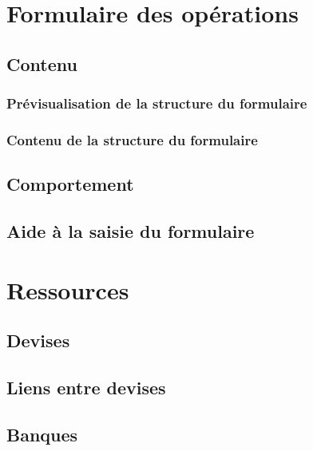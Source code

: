 \section{Formulaire des opérations\label{setup-form}}
 

\subsection{Contenu\label{setup-form-content}}


\subsubsection{Prévisualisation de la structure du formulaire\label{setup-form-content-display}}

\subsubsection{Contenu de la structure du formulaire\label{setup-form-content-fields}}


\subsection{Comportement\label{setup-form-behaviour}}


\subsection{Aide à la saisie du formulaire\label{setup-form-input}}


\section{Ressources\label{setup-resources}}


\subsection{Devises\label{setup-resources-currencies}}


\subsection{Liens entre devises\label{setup-resources-rate}}


\subsection{Banques\label{setup-resources-banks}}


